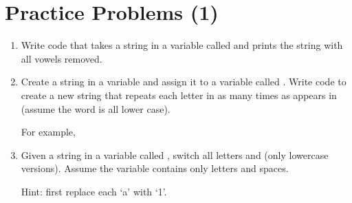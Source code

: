 \documentclass[letterpaper,10pt,english]{sphinxmanual}
\begin{document}
\section{Practice Problems (1)}
\label{\detokenize{lecture_notes/lec04_modules_functions1:practice-problems-1}}\begin{enumerate}
\item {} 
Write code that takes a string in a variable called  and
prints the string with all vowels removed.

\item {} 
Create a string in a variable and assign it to a variable called
.  Write code to create a new string that repeats each
letter  in  as many times as  appears in 
(assume the word is all lower case).

For example,

%
\begin{sphinxVerbatim}[commandchars=\\\{\}]
  




\end{sphinxVerbatim}

\item {} 
Given a string in a variable called , switch all letters
 and  (only lowercase versions). Assume the variable
contains only letters and spaces.

Hint: first replace each ‘a’ with ‘1’.

%
\begin{sphinxVerbatim}[commandchars=\\\{\}]
  



\end{sphinxVerbatim}

\end{enumerate}
\end{document}
